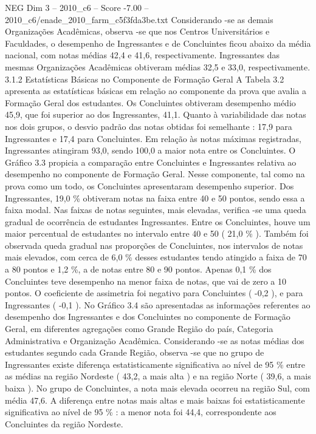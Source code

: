 \begin{textsample}{NEG Dim 3 – 2010\_c6 – Score -7.00 – 2010\_c6/enade\_2010\_farm\_c5f3fda3be.txt}
Considerando -se as demais Organizações Acadêmicas, observa -se que nos Centros Universitários e Faculdades, o desempenho de Ingressantes e de Concluintes ficou abaixo da média nacional, com notas médias 42,4 e 41,6, respectivamente.
Ingressantes das mesmas Organizações Acadêmicas obtiveram médias 32,5 e 33,0, respectivamente. 3.1.2 Estatísticas Básicas no Componente de Formação Geral A Tabela 3.2 apresenta as estatísticas básicas em relação ao componente da prova que avalia a Formação Geral dos estudantes.
Os Concluintes obtiveram desempenho médio 45,9, que foi superior ao dos Ingressantes, 41,1.
Quanto à variabilidade das notas nos dois grupos, o desvio padrão das notas obtidas foi semelhante : 17,9 para Ingressantes e 17,4 para Concluintes.
Em relação às notas máximas registradas, Ingressantes atingiram 93,0, sendo 100,0 a maior nota entre os Concluintes.
O Gráfico 3.3 propicia a comparação entre Concluintes e Ingressantes relativa ao desempenho no componente de Formação Geral.
Nesse componente, tal como na prova como um todo, os Concluintes apresentaram desempenho superior.
Dos Ingressantes, 19,0 \% obtiveram notas na faixa entre 40 e 50 pontos, sendo essa a faixa modal.
Nas faixas de notas seguintes, mais elevadas, verifica -se uma queda gradual de ocorrência de estudantes Ingressantes.
Entre os Concluintes, houve um maior percentual de estudantes no intervalo entre 40 e 50 ( 21,0 \% ).
Também foi observada queda gradual nas proporções de Concluintes, nos intervalos de notas mais elevados, com cerca de 6,0 \% desses estudantes tendo atingido a faixa de 70 a 80 pontos e 1,2 \%, a de notas entre 80 e 90 pontos.
Apenas 0,1 \% dos Concluintes teve desempenho na menor faixa de notas, que vai de zero a 10 pontos.
O coeficiente de assimetria foi negativo para Concluintes ( -0,2 ), e para Ingressantes ( -0,1 ).
No Gráfico 3.4 são apresentadas as informações referentes ao desempenho dos Ingressantes e dos Concluintes no componente de Formação Geral, em diferentes agregações como Grande Região do país, Categoria Administrativa e Organização Acadêmica.
Considerando -se as notas médias dos estudantes segundo cada Grande Região, observa -se que no grupo de Ingressantes existe diferença estatisticamente significativa ao nível de 95 \% entre as médias na região Nordeste ( 43,2, a mais alta ) e na região Norte ( 39,6, a mais baixa ).
No grupo de Concluintes, a nota mais elevada ocorreu na região Sul, com média 47,6.
A diferença entre notas mais altas e mais baixas foi estatisticamente significativa ao nível de 95 \% : a menor nota foi 44,4, correspondente aos Concluintes da região Nordeste.

\end{textsample}
